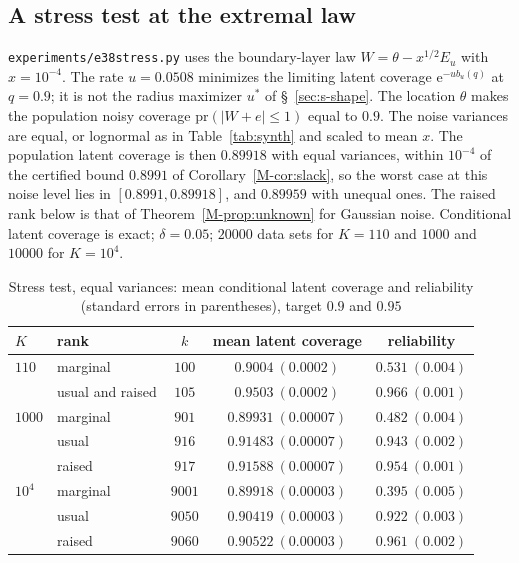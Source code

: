 \documentclass[11pt]{article}
\renewcommand{\_}{\usc\allowbreak}
\newcommand{\pr}{\mathrm{pr}}
\begin{document}
\subsection*{A stress test at the extremal law}

\texttt{experiments/e38\_stress.py} uses the boundary-layer law $W = \theta - x^{1/2}E_u$ with $x = 10^{-4}$. The rate $u = 0.0508$ minimizes the limiting latent coverage $\mathrm{e}^{-ub_u(q)}$ at $q = 0.9$; it is not the radius maximizer $u^*$ of \S~\ref{sec:s-shape}. The location $\theta$ makes the population noisy coverage $\pr(|W + e| \le 1)$ equal to $0.9$. The noise variances are equal, or lognormal as in Table~\ref{tab:synth} and scaled to mean $x$. The population latent coverage is then $0.89918$ with equal variances, within $10^{-4}$ of the certified bound $0.8991$ of Corollary~\ref{M-cor:slack}, so the worst case at this noise level lies in $[0.8991, 0.89918]$, and $0.89959$ with unequal ones. The raised rank below is that of Theorem~\ref{M-prop:unknown} for Gaussian noise. Conditional latent coverage is exact; $\delta = 0.05$; $20000$ data sets for $K = 110$ and $1000$ and $10000$ for $K = 10^4$.

\begin{table}[h]
\centering
\caption{Stress test, equal variances: mean conditional latent coverage and reliability (standard errors in parentheses), target $0.9$ and $0.95$}
\label{tab:s-stress}
\begin{tabular}{llccc}
\toprule
$K$ & rank & $k$ & mean latent coverage & reliability \\
\midrule
$110$ & marginal & $100$ & $0.9004\ (0.0002)$ & $0.531\ (0.004)$ \\
 & usual and raised & $105$ & $0.9503\ (0.0002)$ & $0.966\ (0.001)$ \\
$1000$ & marginal & $901$ & $0.89931\ (0.00007)$ & $0.482\ (0.004)$ \\
 & usual & $916$ & $0.91483\ (0.00007)$ & $0.943\ (0.002)$ \\
 & raised & $917$ & $0.91588\ (0.00007)$ & $0.954\ (0.001)$ \\
$10^4$ & marginal & $9001$ & $0.89918\ (0.00003)$ & $0.395\ (0.005)$ \\
 & usual & $9050$ & $0.90419\ (0.00003)$ & $0.922\ (0.003)$ \\
 & raised & $9060$ & $0.90522\ (0.00003)$ & $0.961\ (0.002)$ \\
\bottomrule
\end{tabular}
\end{table}
\end{document}
